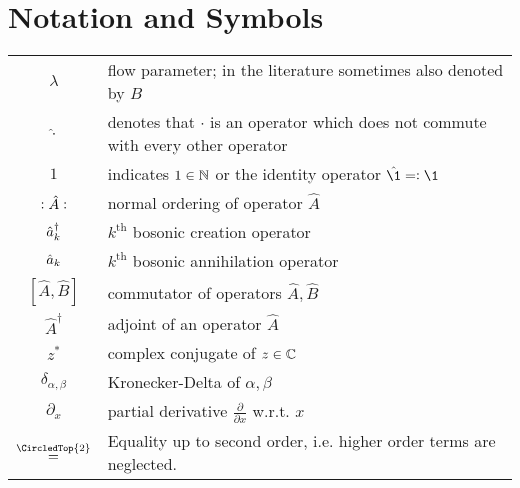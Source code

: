 \chapter*{Notation and Symbols}
\begin{tabular}{cp{}}
  $\lambda$ & flow parameter; in the literature sometimes also denoted by $B$ \\
  $\hat\cdot$ & denotes that $\cdot$ is an operator which does not commute with every other operator\\
  $1$ & indicates $1\in\mathbb{N}$ or the identity operator $\hat{\1}\eqdef \1$\\
  $\vcentcolon \hat A\vcentcolon$ & normal ordering of operator $\hat A$\\ 
  $\hat a^\dagger_k$ & $k^\mathrm{th}$ bosonic creation operator \\
  $\hat a_k$ & $k^\mathrm{th}$ bosonic annihilation operator \\
  $[\hat{ A},\hat{ B}]$ & commutator of operators $\hat{ A},\hat{ B}$ \\
  $\hat A^\dagger$ & adjoint of an operator $\hat{ A}$ \\
  $z^*$ & complex conjugate of $z\in\mathbb{C}$ \\
  $\delta_{\alpha,\beta}$ & Kronecker-Delta of $\alpha,\beta$ \\ 
  $\partial_x$ & partial derivative $\frac{\partial}{\partial x}$ w.r.t. $x$\\
  $\overset{\CircledTop{2}}{=}$ & Equality up to second order, i.e. higher order terms are neglected.
\end{tabular}\\







